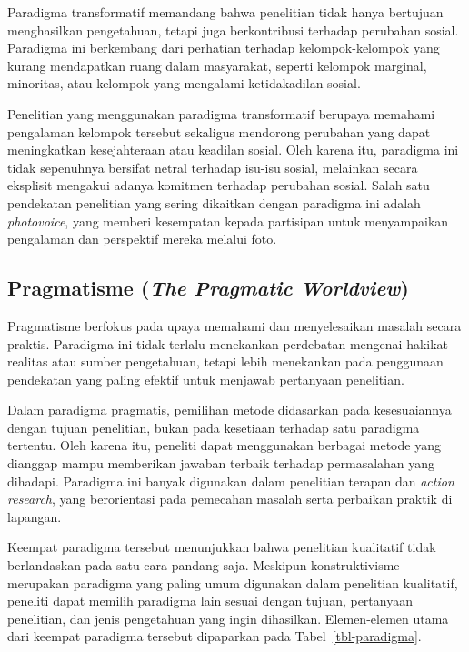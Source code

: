 \documentclass[
  indonesian,
  letterpaper,
  DIV=11,
  numbers=noendperiod]{scrreprt}
\begin{document}
Paradigma transformatif memandang bahwa penelitian tidak hanya bertujuan
menghasilkan pengetahuan, tetapi juga berkontribusi terhadap perubahan
sosial. Paradigma ini berkembang dari perhatian terhadap
kelompok-kelompok yang kurang mendapatkan ruang dalam masyarakat,
seperti kelompok marginal, minoritas, atau kelompok yang mengalami
ketidakadilan sosial.

Penelitian yang menggunakan paradigma transformatif berupaya memahami
pengalaman kelompok tersebut sekaligus mendorong perubahan yang dapat
meningkatkan kesejahteraan atau keadilan sosial. Oleh karena itu,
paradigma ini tidak sepenuhnya bersifat netral terhadap isu-isu sosial,
melainkan secara eksplisit mengakui adanya komitmen terhadap perubahan
sosial. Salah satu pendekatan penelitian yang sering dikaitkan dengan
paradigma ini adalah \emph{photovoice}, yang memberi kesempatan kepada
partisipan untuk menyampaikan pengalaman dan perspektif mereka melalui
foto.

\subsection{\texorpdfstring{Pragmatisme (\emph{The Pragmatic
Worldview})}{Pragmatisme (The Pragmatic Worldview)}}\label{pragmatisme-the-pragmatic-worldview}

Pragmatisme berfokus pada upaya memahami dan menyelesaikan masalah
secara praktis. Paradigma ini tidak terlalu menekankan perdebatan
mengenai hakikat realitas atau sumber pengetahuan, tetapi lebih
menekankan pada penggunaan pendekatan yang paling efektif untuk menjawab
pertanyaan penelitian.

Dalam paradigma pragmatis, pemilihan metode didasarkan pada
kesesuaiannya dengan tujuan penelitian, bukan pada kesetiaan terhadap
satu paradigma tertentu. Oleh karena itu, peneliti dapat menggunakan
berbagai metode yang dianggap mampu memberikan jawaban terbaik terhadap
permasalahan yang dihadapi. Paradigma ini banyak digunakan dalam
penelitian terapan dan \emph{action research}, yang berorientasi pada
pemecahan masalah serta perbaikan praktik di lapangan.

Keempat paradigma tersebut menunjukkan bahwa penelitian kualitatif tidak
berlandaskan pada satu cara pandang saja. Meskipun konstruktivisme
merupakan paradigma yang paling umum digunakan dalam penelitian
kualitatif, peneliti dapat memilih paradigma lain sesuai dengan tujuan,
pertanyaan penelitian, dan jenis pengetahuan yang ingin dihasilkan.
Elemen-elemen utama dari keempat paradigma tersebut dipaparkan pada
Tabel~\ref{tbl-paradigma}.
\end{document}
